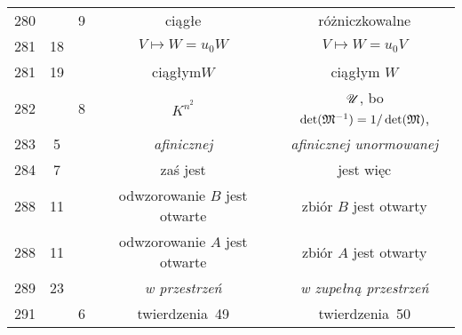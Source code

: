 \documentclass[a4paper,11pt]{article}
\begin{document}
\begin{center}
\begin{tabular}{|c|c|c|c|c|}
    280 & &  9 & ciągłe & różniczkowalne \\
    281 & 18 & & $V \mapsto W = u_{ 0 } W$ & $V \mapsto W = u_{ 0 } V$ \\
    281 & 19 & & ciągłym$W$ & ciągłym $W$ \\
    282 & &  8 & $K^{ n^{ 2 } }$
           & $\mathcal{U}$, bo $\det( \mathfrak{M}^{ -1 } ) = 1 / \det( \mathfrak{M} )$, \\
    283 &  5 & & \textit{afinicznej} & \textit{afinicznej unormowanej} \\
    284 &  7 & & zaś jest & jest więc \\
    288 & 11 & & odwzorowanie $B$ jest otwarte & zbiór $B$ jest otwarty \\
    288 & 11 & & odwzorowanie $A$ jest otwarte & zbiór $A$ jest otwarty \\
    289 & 23 & & \emph{w przestrzeń} & \emph{w zupełną przestrzeń} \\
    291 & &  6 & twierdzenia~49 & twierdzenia~50 \\
    \hline
  \end{tabular}

\end{center}
\end{document}
